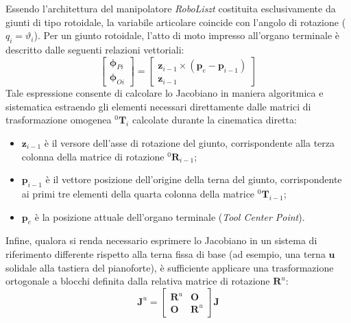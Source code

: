Essendo l'architettura del manipolatore \textit{RoboLiszt} costituita esclusivamente da giunti di tipo rotoidale, la variabile articolare coincide con l'angolo di rotazione ($q_i = \vartheta_i$). 
Per un giunto rotoidale, l'atto di moto impresso all'organo terminale è descritto dalle seguenti relazioni vettoriali:
\begin{equation}
    \begin{bmatrix} 
        \boldsymbol{\phi}_{Pi} \\ \boldsymbol{\phi}_{Oi} 
    \end{bmatrix} 
    = 
    \begin{bmatrix} 
        \boldsymbol{z}_{i-1} \times (\boldsymbol{p}_e - \boldsymbol{p}_{i-1}) \\ \boldsymbol{z}_{i-1} 
    \end{bmatrix}
\end{equation}
Tale espressione consente di calcolare lo Jacobiano in maniera algoritmica e sistematica estraendo gli elementi necessari direttamente dalle matrici di trasformazione omogenea ${}^0\boldsymbol{T}_i$ calcolate durante la cinematica diretta:
\begin{itemize}
    \item $\boldsymbol{z}_{i-1}$ è il versore dell'asse di rotazione del giunto, corrispondente alla terza colonna della matrice di rotazione ${}^0\boldsymbol{R}_{i-1}$;
    \item $\boldsymbol{p}_{i-1}$ è il vettore posizione dell'origine della terna del giunto, corrispondente ai primi tre elementi della quarta colonna della matrice ${}^0\boldsymbol{T}_{i-1}$;
    \item $\boldsymbol{p}_e$ è la posizione attuale dell'organo terminale (\textit{Tool Center Point}).
\end{itemize}
Infine, qualora si renda necessario esprimere lo Jacobiano in un sistema di riferimento differente rispetto alla terna fissa di base (ad esempio, una terna $\boldsymbol{u}$ solidale alla tastiera del pianoforte), è sufficiente applicare una trasformazione ortogonale a blocchi definita dalla relativa matrice di rotazione $\boldsymbol{R}^u$:
\begin{equation}
    \boldsymbol{J}^u = 
    \begin{bmatrix} 
        \boldsymbol{R}^u & \boldsymbol{O} \\ 
        \boldsymbol{O} & \boldsymbol{R}^u 
    \end{bmatrix} 
    \boldsymbol{J}
\end{equation}

